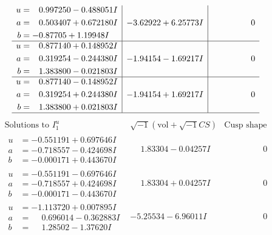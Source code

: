 \documentclass[1p]{elsarticle_modified}
\theoremstyle{definition}
\newcommand{\I}{\sqrt{-1}}
\begin{document}
$$\begin{array}{c|c|c}
\begin{aligned}
u &= \phantom{-}0.997250 - 0.488051 I \\
a &= \phantom{-}0.503407 + 0.672180 I \\
b &= -0.87705 + 1.19948 I\end{aligned}
 & -3.62922 + 6.25773 I & \phantom{-0.000000 } 0 \\ \hline\begin{aligned}
u &= \phantom{-}0.877140 + 0.148952 I \\
a &= \phantom{-}0.319254 - 0.244380 I \\
b &= \phantom{-}1.383800 - 0.021803 I\end{aligned}
 & -1.94154 - 1.69217 I & \phantom{-0.000000 } 0 \\ \hline\begin{aligned}
u &= \phantom{-}0.877140 - 0.148952 I \\
a &= \phantom{-}0.319254 + 0.244380 I \\
b &= \phantom{-}1.383800 + 0.021803 I\end{aligned}
 & -1.94154 + 1.69217 I & \phantom{-0.000000 } 0\\
 \hline 
 \end{array}$$\newpage$$\begin{array}{c|c|c}  
\text{Solutions to }I^u_{1}& \I (\text{vol} + \sqrt{-1}CS) & \text{Cusp shape}\\
 \hline 
\begin{aligned}
u &= -0.551191 + 0.697646 I \\
a &= -0.718557 - 0.424698 I \\
b &= -0.000171 + 0.443670 I\end{aligned}
 & \phantom{-}1.83304 - 0.04257 I & \phantom{-0.000000 } 0 \\ \hline\begin{aligned}
u &= -0.551191 - 0.697646 I \\
a &= -0.718557 + 0.424698 I \\
b &= -0.000171 - 0.443670 I\end{aligned}
 & \phantom{-}1.83304 + 0.04257 I & \phantom{-0.000000 } 0 \\ \hline\begin{aligned}
u &= -1.113720 + 0.007895 I \\
a &= \phantom{-}0.696014 - 0.362883 I \\
b &= \phantom{-}1.28502 - 1.37620 I\end{aligned}
 & -5.25534 - 6.96011 I & \phantom{-0.000000 } 0 \\ \hline\begin{aligned}

\end{aligned}
\end{array}$$
\end{document}
